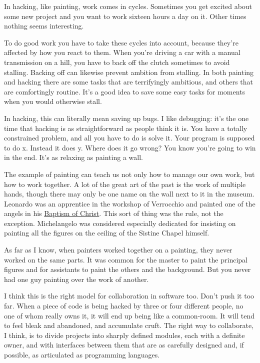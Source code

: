 In hacking, like painting, work comes in cycles. Sometimes you get
excited about some new project and you want to work sixteen hours a day
on it. Other times nothing seems interesting.

To do good work you have to take these cycles into account, because
they're affected by how you react to them. When you're driving a car
with a manual transmission on a hill, you have to back off the clutch
sometimes to avoid stalling. Backing off can likewise prevent ambition
from stalling. In both painting and hacking there are some tasks that
are terrifyingly ambitious, and others that are comfortingly routine.
It's a good idea to save some easy tasks for moments when you would
otherwise stall.

In hacking, this can literally mean saving up bugs. I like debugging:
it's the one time that hacking is as straightforward as people think it
is. You have a totally constrained problem, and all you have to do is
solve it. Your program is supposed to do x. Instead it does y. Where
does it go wrong? You know you're going to win in the end. It's as
relaxing as painting a wall.

The example of painting can teach us not only how to manage our own
work, but how to work together. A lot of the great art of the past is
the work of multiple hands, though there may only be one name on the
wall next to it in the museum. Leonardo was an apprentice in the
workshop of Verrocchio and painted one of the angels in his
\href{baptism.html}{Baptism of Christ}. This sort of thing was the rule,
not the exception. Michelangelo was considered especially dedicated for
insisting on painting all the figures on the ceiling of the Sistine
Chapel himself.

As far as I know, when painters worked together on a painting, they
never worked on the same parts. It was common for the master to paint
the principal figures and for assistants to paint the others and the
background. But you never had one guy painting over the work of another.

I think this is the right model for collaboration in software too. Don't
push it too far. When a piece of code is being hacked by three or four
different people, no one of whom really owns it, it will end up being
like a common-room. It will tend to feel bleak and abandoned, and
accumulate cruft. The right way to collaborate, I think, is to divide
projects into sharply defined modules, each with a definite owner, and
with interfaces between them that are as carefully designed and, if
possible, as articulated as programming languages.

